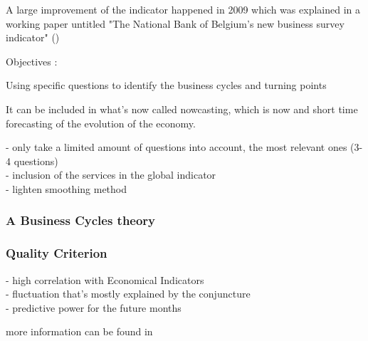 \documentclass[12pt,a4paper,oneside]{book}
\begin{document}
A large improvement of the indicator happened in 2009 which was explained in a working paper untitled "The National Bank of Belgium’s new business survey indicator" 
(\citeauthor{de_greef_national_2009})

Objectives : 

Using specific questions to identify the business cycles and turning points

It can be included in what's now called nowcasting, which is now and short time forecasting of the evolution of the economy.

- only take a limited amount of questions into account, the most relevant ones (3-4 questions) \\
- inclusion of the services in the global indicator \\
- lighten smoothing method

\subsubsection{A Business Cycles theory}

\begin{centering}
\end{centering}




\subsubsection{Quality Criterion}
- high correlation with Economical Indicators \\
- fluctuation that's mostly explained by the conjuncture\\
- predictive power for the future months 





more information can be found in \cite{de_greef_national_2009}
\end{document}

